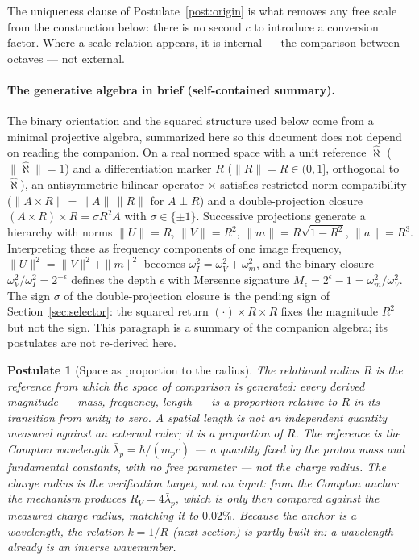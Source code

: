 \documentclass[11pt,a4paper]{article}
\newtheorem{postulate}{Postulate}
\begin{document}
The uniqueness clause of Postulate~\ref{post:origin} is what removes any free scale from the construction below: there is no second $c$ to introduce a conversion factor. Where a scale relation appears, it is internal --- the comparison between octaves --- not external.

\paragraph{The generative algebra in brief (self-contained summary).} The binary orientation and the squared structure used below come from a minimal projective algebra, summarized here so this document does not depend on reading the companion. On a real normed space with a unit reference $\hat\aleph$ ($\|\hat\aleph\|=1$) and a differentiation marker $R$ ($\|R\|=R\in(0,1]$, orthogonal to $\hat\aleph$), an antisymmetric bilinear operator $\times$ satisfies restricted norm compatibility ($\|A\times R\|=\|A\|\,\|R\|$ for $A\perp R$) and a double-projection closure $(A\times R)\times R=\sigma R^2 A$ with $\sigma\in\{\pm1\}$. Successive projections generate a hierarchy with norms $\|U\|=R$, $\|V\|=R^2$, $\|m\|=R\sqrt{1-R^2}$, $\|a\|=R^3$. Interpreting these as frequency components of one image frequency, $\|U\|^2=\|V\|^2+\|m\|^2$ becomes $\omega_I^2=\omega_V^2+\omega_m^2$, and the binary closure $\omega_V^2/\omega_I^2=2^{-\epsilon}$ defines the depth $\epsilon$ with Mersenne signature $M_\epsilon=2^\epsilon-1=\omega_m^2/\omega_V^2$. The sign $\sigma$ of the double-projection closure is the pending sign of Section~\ref{sec:selector}: the squared return $(\cdot)\times R\times R$ fixes the magnitude $R^2$ but not the sign. This paragraph is a summary of the companion algebra; its postulates are not re-derived here.

\begin{postulate}[Space as proportion to the radius]\label{post:space}
The relational radius $R$ is the reference from which the space of comparison is generated: every derived magnitude --- mass, frequency, length --- is a proportion relative to $R$ in its transition from unity to zero. A spatial length is not an independent quantity measured against an external ruler; it is a proportion of $R$. The reference is the Compton wavelength $\bar\lambda_p=\hbar/(m_pc)$ --- a quantity fixed by the proton mass and fundamental constants, with no free parameter --- not the charge radius. The charge radius is the verification target, not an input: from the Compton anchor the mechanism produces $R_V=4\bar\lambda_p$, which is only then compared against the measured charge radius, matching it to $0.02\%$. Because the anchor is a wavelength, the relation $k=1/R$ (next section) is partly built in: a wavelength already is an inverse wavenumber.
\end{postulate}
\end{document}
